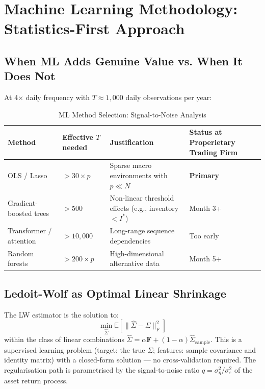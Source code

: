 \documentclass[12pt,a4paper]{article}
\begin{document}
\section{Machine Learning Methodology: Statistics-First Approach}
\label{sec:ml}

\subsection{When ML Adds Genuine Value vs. When It Does Not}

At 4$\times$ daily frequency with $T \approx 1,000$ daily observations per year:

\begin{table}[h]
\centering
\caption{ML Method Selection: Signal-to-Noise Analysis}
\small
\begin{tabular}{p{3.5cm}p{2.5cm}p{5cm}p{2.5cm}}
\toprule
Method & Effective $T$ needed & Justification & Status at Properietary Trading Firm \\
\midrule
OLS / Lasso & $> 30 \times p$ & Sparse macro environments with $p \ll N$ & \textbf{Primary} \\
Gradient-boosted trees & $> 500$ & Non-linear threshold effects (e.g., inventory $< I^*$) & Month 3+ \\
Transformer / attention & $> 10,000$ & Long-range sequence dependencies & Too early \\
Random forests & $> 200 \times p$ & High-dimensional alternative data & Month 5+ \\
\bottomrule
\end{tabular}
\end{table}

\subsection{Ledoit-Wolf as Optimal Linear Shrinkage}

The LW estimator is the solution to:
\begin{equation}
  \min_{\hat{\Sigma}} \mathbb{E}\!\left[\|\hat{\Sigma} - \Sigma\|_F^2\right]
  \label{eq:lwopt}
\end{equation}
within the class of linear combinations $\hat{\Sigma} = \alpha \mathbf{F} + (1-\alpha)\hat{\Sigma}_{\text{sample}}$. This is a supervised learning problem (target: the true $\Sigma$; features: sample covariance and identity matrix) with a closed-form solution — no cross-validation required. The regularisation path is parametrised by the signal-to-noise ratio $q = \sigma^2_\eta/\sigma^2_\varepsilon$ of the asset return process.
\end{document}
